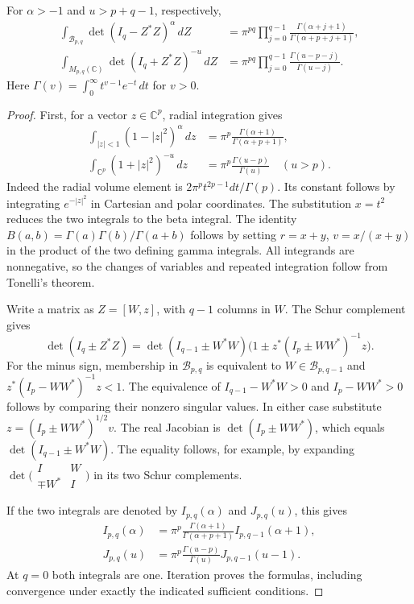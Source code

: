 \begin{lemma}\label{fd-matrix-integrals}
For $\alpha>-1$ and $u>p+q-1$, respectively,
\begin{align}
 \int_{\mathcal B_{p,q}}\det(I_q-Z^*Z)^\alpha\,dZ
   &=\pi^{pq}\prod_{j=0}^{q-1}
                  \frac{\Gamma(\alpha+j+1)}
                       {\Gamma(\alpha+p+j+1)},\label{fd-ball-integral}\\
 \int_{M_{p,q}(\mathbb C)}\det(I_q+Z^*Z)^{-u}\,dZ
   &=\pi^{pq}\prod_{j=0}^{q-1}
                  \frac{\Gamma(u-p-j)}{\Gamma(u-j)}.
                                                   \label{fd-affine-integral}
\end{align}
Here $\Gamma(v)=\int_0^\infty t^{v-1}e^{-t}\,dt$ for $v>0$.
\end{lemma}
\begin{proof}
First, for a vector $z\in\mathbb C^p$, radial integration gives
\begin{align*}
 \int_{|z|<1}(1-|z|^2)^\alpha\,dz
       &=\pi^p\frac{\Gamma(\alpha+1)}
                         {\Gamma(\alpha+p+1)},\\
 \int_{\mathbb C^p}(1+|z|^2)^{-u}\,dz
       &=\pi^p\frac{\Gamma(u-p)}{\Gamma(u)}\quad(u>p).
\end{align*}
Indeed the radial volume element is
$2\pi^p t^{2p-1}dt/\Gamma(p)$. Its constant follows by
integrating $e^{-|z|^2}$ in Cartesian and polar coordinates.
The substitution $x=t^2$ reduces the two integrals to the
beta integral. The identity
$B(a,b)=\Gamma(a)\Gamma(b)/\Gamma(a+b)$ follows by setting
$r=x+y$, $v=x/(x+y)$ in the product of the two defining
gamma integrals. All integrands are nonnegative, so the changes
of variables and repeated integration follow from Tonelli's theorem.

Write a matrix as $Z=[W,z]$, with $q-1$ columns in $W$.
The Schur complement gives
\[
 \det(I_q\pm Z^*Z)
  =\det(I_{q-1}\pm W^*W)
       \bigl(1\pm z^*(I_p\pm WW^*)^{-1}z\bigr).
 \tag{FD1}
\]
For the minus sign, membership in $\mathcal B_{p,q}$ is
equivalent to $W\in\mathcal B_{p,q-1}$ and
$z^*(I_p-WW^*)^{-1}z<1$. The equivalence of
$I_{q-1}-W^*W>0$ and $I_p-WW^*>0$ follows by comparing
their nonzero singular values.
In either case substitute $z=(I_p\pm WW^*)^{1/2}v$.
The real Jacobian is $\det(I_p\pm WW^*)$, which equals
$\det(I_{q-1}\pm W^*W)$. The equality follows, for example,
by expanding $\det\bigl(\begin{smallmatrix}I&W\\
\mp W^*&I\end{smallmatrix}\bigr)$ in its two Schur complements.

If the two integrals are denoted by $I_{p,q}(\alpha)$ and
$J_{p,q}(u)$, this gives
\begin{align*}
 I_{p,q}(\alpha)
   &=\pi^p\frac{\Gamma(\alpha+1)}{\Gamma(\alpha+p+1)}
                                      I_{p,q-1}(\alpha+1),\\
 J_{p,q}(u)
   &=\pi^p\frac{\Gamma(u-p)}{\Gamma(u)}
                                      J_{p,q-1}(u-1).
\end{align*}
At $q=0$ both integrals are one. Iteration proves the formulas,
including convergence under exactly the indicated sufficient
conditions.
\end{proof}

